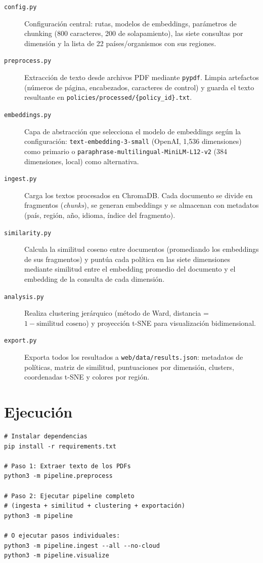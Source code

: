 \begin{description}
\item[\texttt{config.py}] Configuración central: rutas, modelos de embeddings, parámetros de chunking (800 caracteres, 200 de solapamiento), las siete consultas por dimensión y la lista de 22 países/organismos con sus regiones.

\item[\texttt{preprocess.py}] Extracción de texto desde archivos PDF mediante \texttt{pypdf}. Limpia artefactos (números de página, encabezados, caracteres de control) y guarda el texto resultante en \texttt{policies/processed/\{policy\_id\}.txt}.

\item[\texttt{embeddings.py}] Capa de abstracción que selecciona el modelo de embeddings según la configuración: \texttt{text-embedding-3-small} (OpenAI, 1{,}536 dimensiones) como primario o \texttt{paraphrase-multilingual-MiniLM-L12-v2} (384 dimensiones, local) como alternativa.

\item[\texttt{ingest.py}] Carga los textos procesados en ChromaDB. Cada documento se divide en fragmentos (\textit{chunks}), se generan embeddings y se almacenan con metadatos (país, región, año, idioma, índice del fragmento).

\item[\texttt{similarity.py}] Calcula la similitud coseno entre documentos (promediando los embeddings de sus fragmentos) y puntúa cada política en las siete dimensiones mediante similitud entre el embedding promedio del documento y el embedding de la consulta de cada dimensión.

\item[\texttt{analysis.py}] Realiza clustering jerárquico (método de Ward, distancia = $1 - \text{similitud coseno}$) y proyección t-SNE para visualización bidimensional.

\item[\texttt{export.py}] Exporta todos los resultados a \texttt{web/data/results.json}: metadatos de políticas, matriz de similitud, puntuaciones por dimensión, clusters, coordenadas t-SNE y colores por región.
\end{description}

\section{Ejecución}

\begin{verbatim}
# Instalar dependencias
pip install -r requirements.txt

# Paso 1: Extraer texto de los PDFs
python3 -m pipeline.preprocess

# Paso 2: Ejecutar pipeline completo
# (ingesta + similitud + clustering + exportación)
python3 -m pipeline

# O ejecutar pasos individuales:
python3 -m pipeline.ingest --all --no-cloud
python3 -m pipeline.visualize
\end{verbatim}

